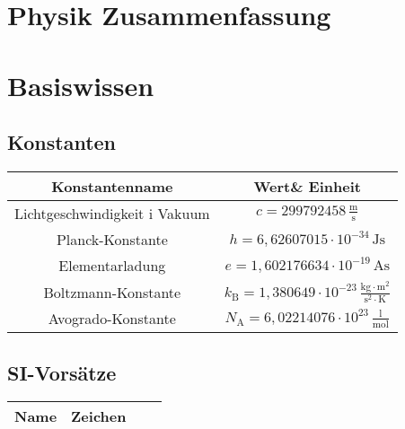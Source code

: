 \documentclass{article}
\begin{document}
\section*{Physik Zusammenfassung}
\section{Basiswissen}
\subsection{Konstanten}
\begin{center}
  \begin{tabular}{c c} 
   \hline
   Konstantenname & Wert\& Einheit\\ 
   \hline
   Lichtgeschwindigkeit i Vakuum & $c=299792458\,\mathrm{\frac{m}{s}}$\\
   Planck-Konstante & $h=6,62607015\cdot 10^{-34}\,\mathrm{Js}$\\
   Elementarladung & $e=1,602176634\cdot 10^{-19}\,\mathrm{As}$\\
   Boltzmann-Konstante & $k_\mathrm{B}=1,380649\cdot 10^{-23}\,\mathrm{\frac{kg\cdot m^2}{s^2\cdot K}}$\\
   Avogrado-Konstante & $N_\mathrm{A}=6,02214076\cdot 10^{23}\,\mathrm{\frac{l}{mol}}$\\
   \hline
  \end{tabular}
\end{center}

\subsection{SI-Vorsätze}
\begin{center}
  \begin{tabular}{c c c c} 
   \hline
   Name & Zeichen & &\\ 
   \hline
   
   \hline
  \end{tabular}
\end{center}
\end{document}
